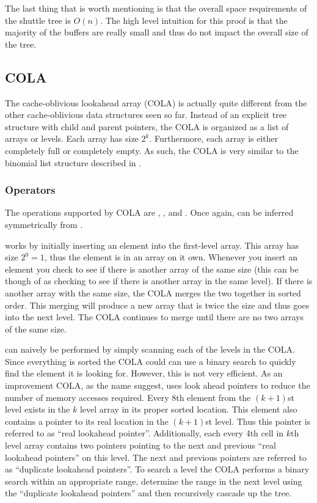 \documentclass{style}
\begin{document}
The last thing that is worth mentioning is that the overall space requirements
of the shuttle tree is $O(n)$. The high level intuition for this proof is that
the majority of the buffers are really small and thus do not impact the
overall size of the tree.

\subsection{COLA}

The cache-oblivious lookahead array (COLA) is actually quite different from
the other cache-oblivious data structures seen so far. Instead of an explicit
tree structure with child and parent pointers, the COLA is organized as a list
of arrays or levels. Each array has size $2^k$. Furthermore, each array is
either completely full or completely empty. As such, the COLA is very similar
to the binomial list structure described in \cite{BentleySaxe}.

\subsubsection{Operators}

The operations supported by COLA are \Search{}, \Insert{}, and \Scan{}. Once
again, \Delete{} can be inferred symmetrically from \Insert{}.

\Insert{} works by initially inserting an element into the first-level array.
This array has size $2^0 = 1$, thus the element is in an array on it own.
Whenever you insert an element you check to see if there is another array of
the same size (this can be though of as checking to see if there is another
array in the same level). If there is another array with the same size, the
COLA merges the two together in sorted order. This merging will produce a new
array that is twice the size and thus goes into the next level. The COLA
continues to merge until there are no two arrays of the same size.

\Search{} can naively be performed by simply scanning each of the levels in
the COLA. Since everything is sorted the COLA could can use a binary search to
quickly find the element it is looking for. However, this is not very
efficient. As an improvement COLA, as the name suggest, uses look ahead
pointers to reduce the number of memory accesses required. Every 8th element
from the $(k+1)$st level exists in the $k$ level array in its proper sorted
location. This element also contains a pointer to its real location in the
$(k+1)$st level. Thus this pointer is referred to as ``real lookahead
pointer''. Additionally, each every 4th cell in $k$th level array contains two
pointers pointing to the next and previous ``real lookahead pointers'' on this
level. The next and previous pointers are referred to as ``duplicate lookahead
pointers''. To search a level the COLA performs a binary search within an
appropriate range, determine the range in the next level using the ``duplicate
lookahead pointers'' and then recursively cascade up the tree.
\end{document}
